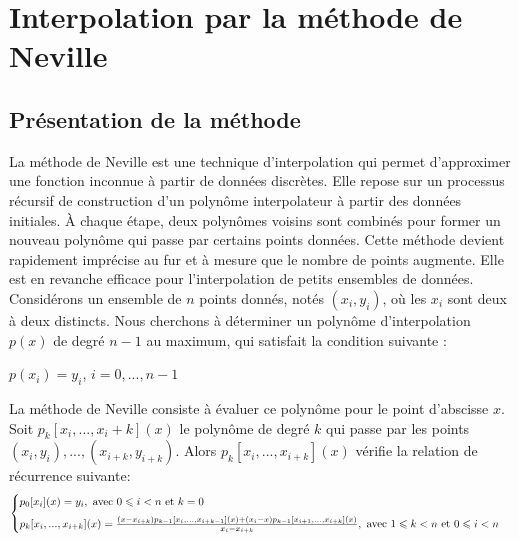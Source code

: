 \section{Interpolation par la méthode de Neville}
\subsection{Présentation de la méthode}
La méthode de Neville est une technique d'interpolation qui permet d'approximer une fonction inconnue à partir de données discrètes. Elle repose sur un processus récursif de construction d'un polynôme interpolateur à partir des données initiales. À chaque étape, deux polynômes voisins sont combinés pour former un nouveau polynôme qui passe par certains points données. Cette méthode devient rapidement imprécise au fur et à mesure que le nombre de points augmente. Elle est en revanche efficace pour l'interpolation de petits ensembles de données.\vspace{6pt}\\
Considérons un ensemble de $n$ points donnés, notés $(x_i, y_i)$, où les $x_i$ sont deux à deux distincts. Nous cherchons à déterminer un polynôme d'interpolation $p(x)$ de degré $n-1$ au maximum, qui satisfait la condition suivante :
\begin{center}
    $p(x_i)=y_i$,  $i=0, ..., n-1$
\end{center}
La méthode de Neville consiste à évaluer ce polynôme pour le point d'abscisse $x$.\\
Soit $p_k[x_i, ..., x_i+k](x)$ le polynôme de degré $k$ qui passe par les points $(x_i, y_i), ..., (x_{i+k}, y_{i+k})$. Alors $p_k[x_i, ..., x_{i+k}](x)$ vérifie la relation de récurrence suivante:\label{recurrence}\vspace{5pt}\\
\begin{equation*}
        \begin{cases}
            p_0[x_i](x)=y_i, \text{     avec  } 0\leqslant i< n \text{  et } k=0\vspace{6pt} \\
            p_k[x_i, ..., x_{i+k}](x)=\frac{(x-x_{i+k})p_{k-1}[x_i, ..., x_{i+k-1}](x)+(x_i-x)p_{k-1}[x_{i+1}, ..., x_{i+k}](x)}{x_i-x_{i+k}}, \text{     avec  } 1\leqslant k<n \text{ et } 0\leqslant i< n
        \end{cases}
\end{equation*}

